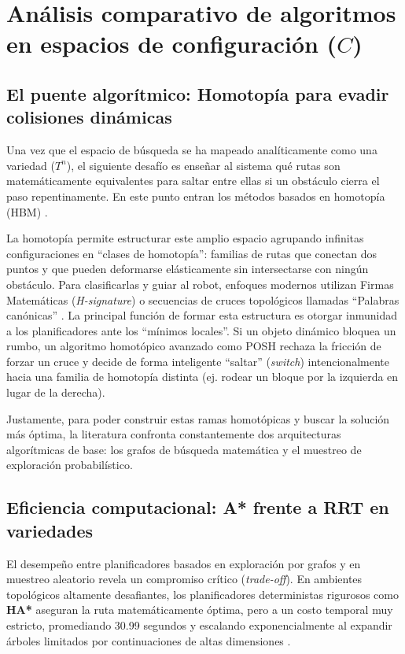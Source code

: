 \section{Análisis comparativo de algoritmos en espacios de configuración ($C$)}

\subsection{El puente algorítmico: Homotopía para evadir colisiones dinámicas}
Una vez que el espacio de búsqueda se ha mapeado analíticamente como una 
variedad ($T^n$), el siguiente desafío es enseñar al sistema qué rutas son 
matemáticamente equivalentes para saltar entre ellas si un obstáculo cierra el 
paso repentinamente. En este punto entran los métodos basados en homotopía 
(HBM) \parencite{radhakrishnan2024state2}.

La homotopía permite estructurar este amplio espacio agrupando infinitas 
configuraciones en \enquote{clases de homotopía}: familias de rutas que 
conectan dos puntos y que pueden deformarse elásticamente sin intersectarse con 
ningún obstáculo. Para clasificarlas y guiar al robot, enfoques modernos utilizan 
Firmas Matemáticas (\textit{H-signature}) o secuencias de cruces topológicos 
llamadas \enquote{Palabras canónicas} \parencite{Bhattacharya2012Topological}. 
La principal función de formar esta estructura es otorgar inmunidad a los 
planificadores ante los \enquote{mínimos locales}. Si un objeto dinámico bloquea 
un rumbo, un algoritmo homotópico avanzado como POSH rechaza la fricción de forzar 
un cruce y decide de forma inteligente \enquote{saltar} (\textit{switch}) 
intencionalmente hacia una familia de homotopía distinta (ej. rodear un bloque 
por la izquierda en lugar de la derecha).

Justamente, para poder construir estas ramas homotópicas y buscar la solución 
más óptima, la literatura confronta constantemente dos arquitecturas algorítmicas 
de base: los grafos de búsqueda matemática y el muestreo de exploración probabilístico.

\subsection{Eficiencia computacional: A* frente a RRT en variedades}
El desempeño entre planificadores basados en exploración por grafos y en 
muestreo aleatorio revela un compromiso crítico (\textit{trade-off}). En 
ambientes topológicos altamente desafiantes, los planificadores deterministas 
rigurosos como \textbf{HA*} aseguran la ruta matemáticamente óptima, pero a un 
costo temporal muy estricto, promediando 30.99 segundos y escalando exponencialmente 
al expandir árboles limitados por continuaciones de altas dimensiones 
\parencite{Bhattacharya2012Topological, radhakrishnan2024state}.

